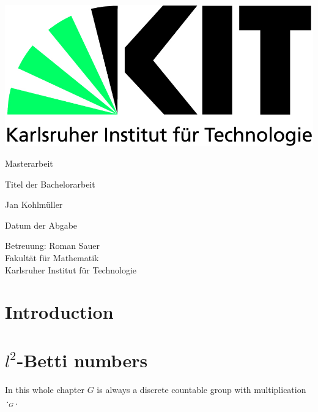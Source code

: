 \documentclass[12pt,a4paper]{scrartcl}
\numberwithin{equation}{section}
\newcommand{\2}{\mathbb{Z} / 2 \mathbb{Z}}
\newcommand{\1}{\overline{1}}
\newcommand{\0}{\overline{0}}
\begin{document}
  \pagestyle{empty}

  \begin{titlepage}

    \includegraphics[scale=0.45]{kit-logo.jpg} 
    \vspace*{2cm} 

 \begin{center} \large 
    
    Masterarbeit
    \vspace*{2cm}

    {\huge Titel der Bachelorarbeit}
    \vspace*{2.5cm}

    Jan Kohlmüller
    \vspace*{1.5cm}

    Datum der Abgabe
    \vspace*{4.5cm}


    Betreuung: Roman Sauer \\[1cm]
    Fakultät für Mathematik \\[1cm]
		Karlsruher Institut für Technologie
  \end{center}
\end{titlepage}



  \tableofcontents

\newpage
 


  \pagestyle{headings}

\section{Introduction}


\section{$l^2$-Betti numbers}
In this whole chapter $G$ is always a discrete countable group with multiplication $\cdot_G$.
\end{document}
